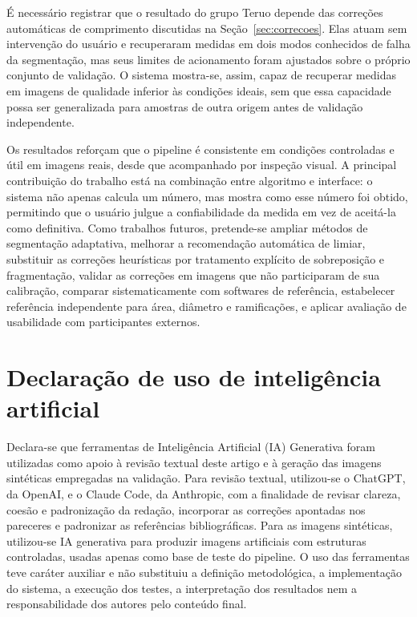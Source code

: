 \documentclass[12pt]{article}
\begin{document}
É necessário registrar que o resultado do grupo Teruo depende das correções automáticas de comprimento discutidas na Seção~\ref{sec:correcoes}. Elas atuam sem intervenção do usuário e recuperaram medidas em dois modos conhecidos de falha da segmentação, mas seus limites de acionamento foram ajustados sobre o próprio conjunto de validação. O sistema mostra-se, assim, capaz de recuperar medidas em imagens de qualidade inferior às condições ideais, sem que essa capacidade possa ser generalizada para amostras de outra origem antes de validação independente.

Os resultados reforçam que o pipeline é consistente em condições controladas e útil em imagens reais, desde que acompanhado por inspeção visual. A principal contribuição do trabalho está na combinação entre algoritmo e interface: o sistema não apenas calcula um número, mas mostra como esse número foi obtido, permitindo que o usuário julgue a confiabilidade da medida em vez de aceitá-la como definitiva. Como trabalhos futuros, pretende-se ampliar métodos de segmentação adaptativa, melhorar a recomendação automática de limiar, substituir as correções heurísticas por tratamento explícito de sobreposição e fragmentação, validar as correções em imagens que não participaram de sua calibração, comparar sistematicamente com softwares de referência, estabelecer referência independente para área, diâmetro e ramificações, e aplicar avaliação de usabilidade com participantes externos.

\section*{Declaração de uso de inteligência artificial}

Declara-se que ferramentas de Inteligência Artificial (IA) Generativa foram utilizadas como apoio à revisão textual deste artigo e à geração das imagens sintéticas empregadas na validação. Para revisão textual, utilizou-se o ChatGPT, da OpenAI, e o Claude Code, da Anthropic, com a finalidade de revisar clareza, coesão e padronização da redação, incorporar as correções apontadas nos pareceres e padronizar as referências bibliográficas. Para as imagens sintéticas, utilizou-se IA generativa para produzir imagens artificiais com estruturas controladas, usadas apenas como base de teste do pipeline. O uso das ferramentas teve caráter auxiliar e não substituiu a definição metodológica, a implementação do sistema, a execução dos testes, a interpretação dos resultados nem a responsabilidade dos autores pelo conteúdo final.



\end{document}
